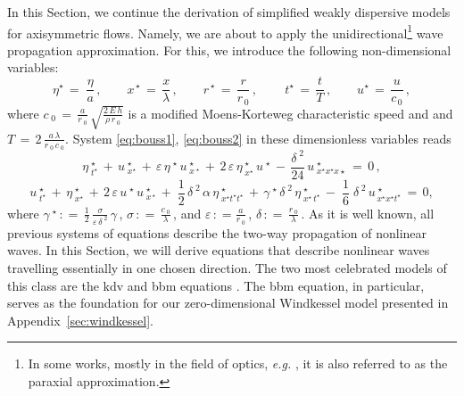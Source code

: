 \documentclass[alpha-refs, 12pt]{wiley-article}
\newcommand{\eps}{\varepsilon}
\newcommand{\eqdef}{\mathrel{\mathop:}=}
\begin{document}
In this Section, we continue the derivation of simplified weakly dispersive models for axisymmetric flows. Namely, we are about to apply the unidirectional\footnote{In some works, mostly in the field of optics, \emph{e.g.} \cite{Agrawal1979}, it is also referred to as the paraxial approximation.} wave propagation approximation. For this, we introduce the following non-dimensional variables:
\begin{equation*}
   \eta^{\star}\,=\;\frac{\eta}{a}\,, \qquad x^{\,\star}\,=\,\frac{x}{\lambda}\,, \qquad r^{\,\star}\,=\,\frac{r}{r_{\,0}}\,,\,\qquad t^{\star}\,=\,\frac{t}{T}\,,\qquad u^{\star}\,=\,\frac{u}{c_{\,0}}\,,
\end{equation*}
where $c_{\;0}\,=\,\displaystyle\frac{a}{r_{\;0}}\,\sqrt{\frac{2\,E\,h}{ \rho\,r_{\;0}}}$ is a modified Moens-Korteweg characteristic speed and and $T\,=\,2\,\displaystyle\frac{a\,\lambda}{r_{\;0}\,c_{\;0}}$. System \eqref{eq:bouss1}, \eqref{eq:bouss2} in these dimensionless variables reads
\begin{equation}\label{eq:bouss1d}
  \eta^{\;\star}_{\;t^{\star}}\,+\,u^{\;\star}_{\;x^{\star}} \,+\, \eps\,\eta^{\;\star}\,u^{\;\star}_{\;x^{\;\star}}\,+\,2\,\eps\,\eta^{\;\star}_{\;x^{\star}}\,u^{\;\star}\,-\,\frac{\delta^{\;2}}{24}\,u^{\;\star}_{\;x^{\star}x^{ \star}x{\star}}\,=\,0\,,
\end{equation}
\begin{equation}\label{eq:bouss2d}
  u^{\;\star}_{\;t^{\star}}\, + \,\eta^{\;\star}_{\;x^{\star}}\, + \,2\,\eps\,u^{\;\star}\,u^{\;\star}_{\;x^{\,\star}}\, + \;\frac{1}{2}\,\delta^{\;2}\,\alpha\,\eta^{\;\star}_{\;x^{\star}t^{\star}t^{\star}}\, + \,\gamma^{\;\star}\,\delta^{\;2}\,\eta^{\;\star}_{\;x^{\star}\,t^{\star}}\, - \;\frac{1}{6}\;\delta^{\;2}\,u^{\;\star}_{\,x^{\star}x^{\star}t^{\star}}\,=\,0,
\end{equation}
where $\gamma^{\;\star}\,\eqdef\,\displaystyle\frac{1}{2}\,\frac{\sigma}{\eps\,\delta^{\;2}}\,\gamma\,$, $\sigma\,\eqdef\,\frac{c_{\;0}}{\lambda}\,$,  and $\eps\,\eqdef\frac{a}{r_{\;0}}\,$, $\delta\,\eqdef\,\frac{r_{\;0}}{\lambda}\,$. As it is well known, all previous systems of equations describe the two-way propagation of nonlinear waves. In this Section, we will derive equations that describe nonlinear waves travelling essentially in one chosen direction. The two most celebrated models of this class are the \acrshort{kdv} and \acrshort{bbm} equations \citep{KdV, bona, Bona1975a, Zabusky1971, Dutykh2013a, Dutykh2014d, Dutykh2014a, Cheviakov2021, cheviakov2024analytical}. The \acrshort{bbm} equation, in particular, serves as the foundation for our zero-dimensional Windkessel model presented in Appendix~\ref{sec:windkessel}.
\end{document}
